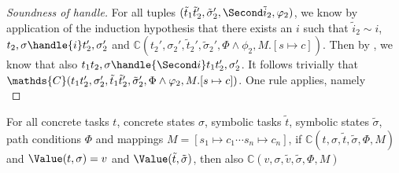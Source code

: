 \begin{proof}[Soundness of handle]
{  For all tuples $(\tilde{t}_1\And\tilde{t}_2',\tilde{\sigma}_2',\Second \tilde{i}_2,\phi_2)$,
  we know by application of the induction hypothesis that there exists an $i$ such that
  $\tilde{i}_2\sim i$, $t_2,\sigma\handle{i}t_2',\sigma_2'$ and
  $\mathds{C}(t_2',\sigma_2',\tilde{t}_2',\tilde{\sigma}_2',\Phi\land\phi_2,M.[s\mapsto c])$.
  Then by , we know that also $t_1\And t_2,\sigma\handle{\Second i}t_1\And t_2',\sigma_2'$.
  It follows trivially that $\mathds{C}(t_1\And t_2',\sigma_2',\tilde{t}_1\And \tilde{t}_2',\tilde{\sigma}_2',\Phi\land\phi_2,M.[s\mapsto c])$.
}
%
{One rule applies, namely \\
%
%
%
%
%
%
}

\end{proof}


\begin{lemma}
  \label{lem:valpres}
  For all concrete tasks $t$, concrete states $\sigma$, symbolic tasks $\tilde{t}$, symbolic states $\tilde{\sigma}$, path conditions $\Phi$ and mappings $M=[s_1\mapsto c_1\cdots s_n\mapsto c_n]$,
  if $\mathds{C}(t,\sigma,\tilde{t},\tilde{\sigma},\Phi,M)$ and $\Value(t,\sigma)=v$ and $\Value(\tilde{t},\tilde{\sigma})$,
  then also $\mathds{C}(v,\sigma,\tilde{v},\tilde{\sigma},\Phi,M)$
\end{lemma}

